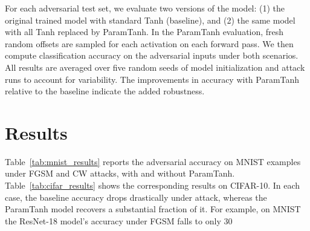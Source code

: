 \documentclass{llncs}
\begin{document}
For each adversarial test set, we evaluate two versions of the model: (1) the original trained model with standard Tanh (baseline), and (2) the same model with all Tanh replaced by ParamTanh. In the ParamTanh evaluation, fresh random offsets are sampled for each activation on each forward pass. We then compute classification accuracy on the adversarial inputs under both scenarios. All results are averaged over five random seeds of model initialization and attack runs to account for variability. The improvements in accuracy with ParamTanh relative to the baseline indicate the added robustness. \section{Results}
Table~\ref{tab:mnist_results} reports the adversarial accuracy on MNIST examples under FGSM and CW attacks, with and without ParamTanh. Table~\ref{tab:cifar_results} shows the corresponding results on CIFAR-10. In each case, the baseline accuracy drops drastically under attack, whereas the ParamTanh model recovers a substantial fraction of it. For example, on MNIST the ResNet-18 model’s accuracy under FGSM falls to only 30%
\centering
\end{document}
